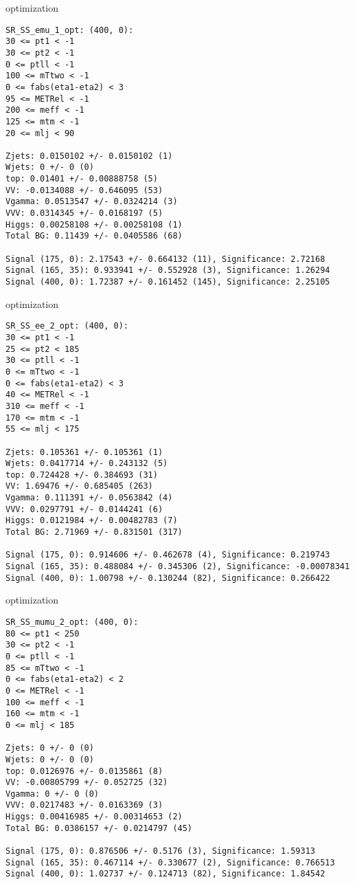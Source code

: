 \begin{frame}[fragile]{optimization}
\tiny
\begin{verbatim}
SR_SS_emu_1_opt: (400, 0):
30 <= pt1 < -1
30 <= pt2 < -1
0 <= ptll < -1
100 <= mTtwo < -1
0 <= fabs(eta1-eta2) < 3
95 <= METRel < -1
200 <= meff < -1
125 <= mtm < -1
20 <= mlj < 90

Zjets: 0.0150102 +/- 0.0150102 (1)
Wjets: 0 +/- 0 (0)
top: 0.01401 +/- 0.00888758 (5)
VV: -0.0134088 +/- 0.646095 (53)
Vgamma: 0.0513547 +/- 0.0324214 (3)
VVV: 0.0314345 +/- 0.0168197 (5)
Higgs: 0.00258108 +/- 0.00258108 (1)
Total BG: 0.11439 +/- 0.0405586 (68)

Signal (175, 0): 2.17543 +/- 0.664132 (11), Significance: 2.72168
Signal (165, 35): 0.933941 +/- 0.552928 (3), Significance: 1.26294
Signal (400, 0): 1.72387 +/- 0.161452 (145), Significance: 2.25105
\end{verbatim}
\end{frame}

\begin{frame}[fragile]{optimization}
\tiny
\begin{verbatim}
SR_SS_ee_2_opt: (400, 0):
30 <= pt1 < -1
25 <= pt2 < 185
30 <= ptll < -1
0 <= mTtwo < -1
0 <= fabs(eta1-eta2) < 3
40 <= METRel < -1
310 <= meff < -1
170 <= mtm < -1
55 <= mlj < 175

Zjets: 0.105361 +/- 0.105361 (1)
Wjets: 0.0417714 +/- 0.243132 (5)
top: 0.724428 +/- 0.384693 (31)
VV: 1.69476 +/- 0.685405 (263)
Vgamma: 0.111391 +/- 0.0563842 (4)
VVV: 0.0297791 +/- 0.0144241 (6)
Higgs: 0.0121984 +/- 0.00482783 (7)
Total BG: 2.71969 +/- 0.831501 (317)

Signal (175, 0): 0.914606 +/- 0.462678 (4), Significance: 0.219743
Signal (165, 35): 0.488084 +/- 0.345306 (2), Significance: -0.00078341
Signal (400, 0): 1.00798 +/- 0.130244 (82), Significance: 0.266422
\end{verbatim}
\end{frame}

\begin{frame}[fragile]{optimization}
\tiny
\begin{verbatim}
SR_SS_mumu_2_opt: (400, 0):
80 <= pt1 < 250
30 <= pt2 < -1
0 <= ptll < -1
85 <= mTtwo < -1
0 <= fabs(eta1-eta2) < 2
0 <= METRel < -1
100 <= meff < -1
160 <= mtm < -1
0 <= mlj < 185

Zjets: 0 +/- 0 (0)
Wjets: 0 +/- 0 (0)
top: 0.0126976 +/- 0.0135861 (8)
VV: -0.00805799 +/- 0.052725 (32)
Vgamma: 0 +/- 0 (0)
VVV: 0.0217483 +/- 0.0163369 (3)
Higgs: 0.00416985 +/- 0.00314653 (2)
Total BG: 0.0386157 +/- 0.0214797 (45)

Signal (175, 0): 0.876506 +/- 0.5176 (3), Significance: 1.59313
Signal (165, 35): 0.467114 +/- 0.330677 (2), Significance: 0.766513
Signal (400, 0): 1.02737 +/- 0.124713 (82), Significance: 1.84542
\end{verbatim}
\end{frame}

